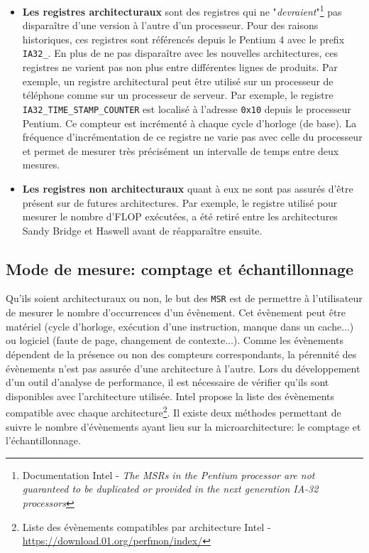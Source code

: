         \begin{itemize}
            \item \textbf{Les registres architecturaux} sont des registres qui ne "\textit{devraient}"\footnote{Documentation Intel \cite{Intel2018} - \textit{The MSRs in the Pentium processor are not guaranteed to be duplicated or provided in the next generation IA-32 processors}} pas disparaître d'une version à l'autre d'un processeur. Pour des raisons historiques, ces registres sont référencés depuis le Pentium 4 avec le prefix \verb|IA32_|. En plus de ne pas disparaître avec les nouvelles architectures, ces registres ne varient pas non plus entre différentes lignes de produits. Par exemple, un registre architectural peut 
           être utilisé sur un processeur de téléphone comme sur un processeur de serveur. Par exemple, le registre \verb|IA32_TIME_STAMP_COUNTER| est localisé à l'adresse \verb|0x10| depuis le processeur Pentium. Ce compteur est incrémenté à chaque cycle d'horloge (de base). La fréquence d'incrémentation de ce registre ne varie pas avec celle du processeur et permet de mesurer très précisément un intervalle de temps entre deux mesures. 
            
            \item \textbf{Les registres non architecturaux} quant à eux ne sont pas assurés d'être présent sur de futures architectures. Par exemple, le registre utilisé pour mesurer le nombre d'\gls{FLOP} exécutées, a été retiré entre les architectures Sandy Bridge et Haswell avant de réapparaître ensuite. 
    
            
        \end{itemize}
        
    \subsection{Mode de mesure: comptage et échantillonnage}\label{sec:sampling}
    
        Qu'ils soient architecturaux ou non, le but des \verb|MSR| est de permettre à l'utilisateur de mesurer le nombre d'occurrences d'un évènement. Cet évènement peut être matériel (cycle d'horloge, exécution d'une instruction, manque dans un cache...) ou logiciel (faute de page, changement de contexte...). Comme les évènements dépendent de la présence ou non des compteurs correspondants, la pérennité des évènements n'est pas assurée d'une architecture à l'autre. Lors du développement d'un outil d'analyse de performance, il est nécessaire de vérifier qu'ils sont disponibles avec l'architecture utilisée. Intel propose la liste des évènements compatible avec chaque architecture\footnote{Liste des évènements compatibles par architecture Intel - \url{https://download.01.org/perfmon/index/}}. Il existe deux méthodes permettant de suivre le nombre d'évènements ayant lieu sur la microarchitecture: le comptage et l'échantillonnage.
    
